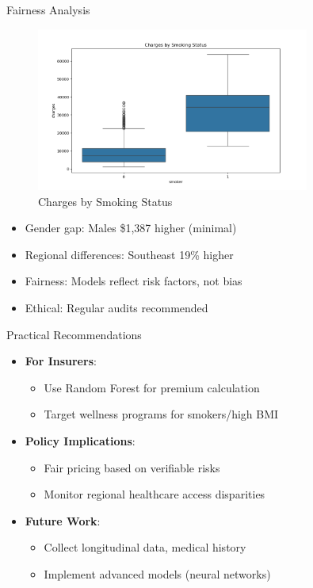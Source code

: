 \documentclass[10pt]{beamer}
\begin{document}
\begin{frame}{Fairness Analysis}
\begin{figure}
\includegraphics[width=0.8\textwidth]{smoker_boxplot.png}
\caption{Charges by Smoking Status}
\end{figure}
\begin{itemize}
\item Gender gap: Males \$1,387 higher (minimal)
\item Regional differences: Southeast 19\% higher
\item Fairness: Models reflect risk factors, not bias
\item Ethical: Regular audits recommended
\end{itemize}
\end{frame}

\begin{frame}{Practical Recommendations}
\begin{itemize}
\item \textbf{For Insurers}:
  \begin{itemize}
  \item Use Random Forest for premium calculation
  \item Target wellness programs for smokers/high BMI
  \end{itemize}
\item \textbf{Policy Implications}:
  \begin{itemize}
  \item Fair pricing based on verifiable risks
  \item Monitor regional healthcare access disparities
  \end{itemize}
\item \textbf{Future Work}:
  \begin{itemize}
  \item Collect longitudinal data, medical history
  \item Implement advanced models (neural networks)
  \end{itemize}
\end{itemize}
\end{frame}
\end{document}
